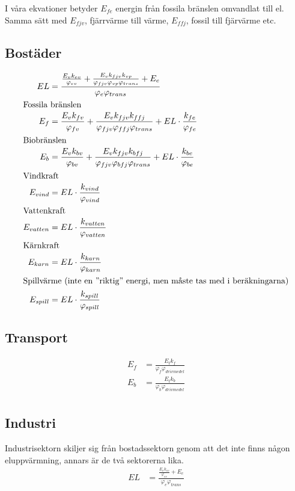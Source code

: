 \documentclass[a4paper,11pt,fleqn, titlepage]{article}
\begin{document}
I våra ekvationer betyder $E_{fe}$ energin från fossila bränslen omvandlat
till el. Samma sätt med $E_{fjv}$, fjärrvärme till värme, $E_{ffj}$, fossil
till fjärvärme etc.

\newpage

\subsection{Bostäder}
\begin{align*}
	EL &= \frac{\frac{E_v k_{ev}}{\varphi_{ev}} + \frac{E_v k_{fjv}
	k_{vp}}{\varphi_{fjv} \varphi_{vp} \varphi_{trans}} +
	E_e}{\varphi_e \varphi_{trans}} \\
\intertext{Fossila bränslen}
	E_f &= \frac{E_v k_{fv}}{\varphi_{fv}} + \frac{E_v k_{fjv}
	k_{ffj}}{\varphi_{fjv} \varphi_{ffj} \varphi_{trans}} + EL
	\cdot \frac{k_{fe}}{\varphi_{fe}} \\
\intertext{Biobränslen}
	E_b &= \frac{E_v k_{bv}}{\varphi_{bv}} + \frac{E_v k_{fjv}
	k_{bfj}}{\varphi_{fjv} \varphi_{bfj} \varphi_{trans}} + EL
	\cdot \frac{k_{be}}{\varphi_{be}} \\
\intertext{Vindkraft}
	E_{vind} &= EL \cdot \frac{k_{vind}}{\varphi_{vind}} \\
\intertext{Vattenkraft}
	E_{vatten} &= EL \cdot \frac{k_{vatten}}{\varphi_{vatten}} \\
\intertext{Kärnkraft}
	E_{karn} &= EL \cdot \frac{k_{karn}}{\varphi_{karn}} \\
\intertext{Spillvärme (inte en ''riktig'' energi, men måste tas med i beräkningarna)}
	E_{spill} &= EL \cdot \frac{k_{spill}}{\varphi_{spill}} \\
\end{align*}


\subsection{Transport}
\begin{align*}
	E_f &= \frac{E_t k_f}{\varphi_f \varphi_{drivmedel}} \\
	E_b &= \frac{E_t k_b}{\varphi_b \varphi_{drivmedel}} \\
\end{align*}


\subsection{Industri}
Industrisektorn skiljer sig från bostadssektorn genom att det inte finns
någon eluppvärmning, annars är de två sektorerna lika.
\begin{align*}
	EL &= \frac{\frac{E_v k_{ev}}{\varphi_{ev}} + E_e}{\varphi_e
	\varphi_{trans}} \\
\end{align*}
\end{document}
